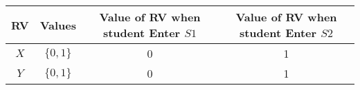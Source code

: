 
\begin{center}
\begin{tabular}{|c|c|c|c|}
\hline
\textbf{RV}& \textbf{Values} & \textbf{Value of RV when student Enter $S1$} &\textbf{Value of RV when student Enter $S2$} \\ \hline
$X$		   & 	$\{0,1\}$		&   0      & 1\\ \hline
$Y$ 		   & 	$\{0,1\}$	&	0      & 1\\ \hline
\end{tabular}
\end{center}